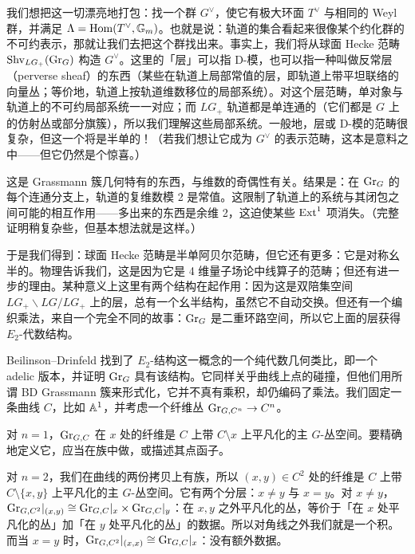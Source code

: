 我们想把这一切漂亮地打包：找一个群 $G^\vee$，使它有极大环面 $T^\vee$ 与相同的 Weyl 群，并满足 $\Lambda=\operatorname{Hom}(T^\vee,\mathbb{G}_m)$。也就是说：轨道的集合看起来很像某个约化群的不可约表示，那就让我们去把这个群找出来。事实上，我们将从球面 Hecke 范畴 $\mathrm{Shv}_{LG_+}(\mathrm{Gr}_G)$ 构造 $G^\vee$。这里的「层」可以指 D-模，也可以指一种叫做反常层（perverse sheaf）的东西（某些在轨道上局部常值的层，即轨道上带平坦联络的向量丛；等价地，轨道上按轨道维数移位的局部系统）。对这个层范畴，单对象与轨道上的不可约局部系统一一对应；而 $LG_+$ 轨道都是单连通的（它们都是 $G$ 上的仿射丛或部分旗簇），所以我们理解这些局部系统。一般地，层或 D-模的范畴很复杂，但这一个将是半单的！（若我们想让它成为 $G^\vee$ 的表示范畴，这本是意料之中——但它仍然是个惊喜。）

这是 Grassmann 簇几何特有的东西，与维数的奇偶性有关。结果是：在 $\mathrm{Gr}_G$ 的每个连通分支上，轨道的复维数模 2 是常值。这限制了轨道上的系统与其闭包之间可能的相互作用——多出来的东西是余维 2，这迫使某些 $\operatorname{Ext}^1$ 项消失。（完整证明稍复杂些，但基本想法就是这样。）

于是我们得到：球面 Hecke 范畴是半单阿贝尔范畴，但它还有更多：它是对称幺半的。物理告诉我们，这是因为它是 4 维量子场论中线算子的范畴；但还有进一步的理由。某种意义上这里有两个结构在起作用：因为这是双陪集空间 $LG_+\backslash LG/LG_+$ 上的层，总有一个幺半结构，虽然它不自动交换。但还有一个编织乘法，来自一个完全不同的故事：$\mathrm{Gr}_G$ 是二重环路空间，所以它上面的层获得 $E_2$-代数结构。

Beilinson–Drinfeld 找到了 $E_2$-结构这一概念的一个纯代数几何类比，即一个 adelic 版本，并证明 $\mathrm{Gr}_G$ 具有该结构。它同样关乎曲线上点的碰撞，但他们用所谓 BD Grassmann 簇来形式化，它并不真有乘积，却仍编码了乘法。我们固定一条曲线 $C$，比如 $\mathbb{A}^1$，并考虑一个纤维丛 $\mathrm{Gr}_{G,C^n}\to C^n$。


对 $n=1$，$\mathrm{Gr}_{G,C}$ 在 $x$ 处的纤维是 $C$ 上带 $C\setminus x$ 上平凡化的主 $G$-丛空间。要精确地定义它，应当在族中做，或描述其点函子。

对 $n=2$，我们在曲线的两份拷贝上有族，所以 $(x,y)\in C^2$ 处的纤维是 $C$ 上带 $C\setminus\{x,y\}$ 上平凡化的主 $G$-丛空间。它有两个分层：$x\ne y$ 与 $x=y$。对 $x\ne y$，$\mathrm{Gr}_{G,C^2}|_{(x,y)}\cong \mathrm{Gr}_{G,C}|_x\times\mathrm{Gr}_{G,C}|_y$：在 $x,y$ 之外平凡化的丛，等价于「在 $x$ 处平凡化的丛」加「在 $y$ 处平凡化的丛」的数据。所以对角线之外我们就是一个积。而当 $x=y$ 时，$\mathrm{Gr}_{G,C^2}|_{(x,x)}\cong\mathrm{Gr}_{G,C}|_x$：没有额外数据。

